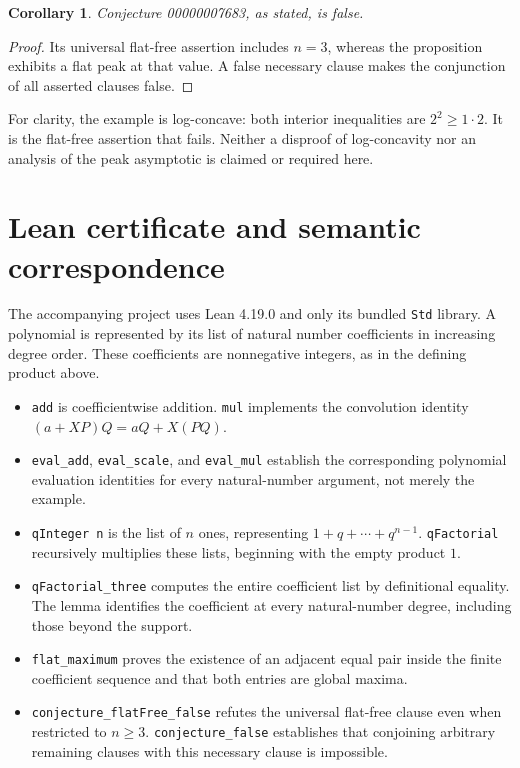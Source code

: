 \documentclass[11pt]{article}
\newtheorem{corollary}{Corollary}
\begin{document}
\begin{corollary}
Conjecture 00000007683, as stated, is false.
\end{corollary}
\begin{proof}
Its universal flat-free assertion includes $n=3$, whereas the proposition
exhibits a flat peak at that value. A false necessary clause makes the
conjunction of all asserted clauses false.
\end{proof}

For clarity, the example is log-concave: both interior inequalities are
$2^2\geq 1\cdot 2$. It is the flat-free assertion that fails. Neither a
disproof of log-concavity nor an analysis of the peak asymptotic is claimed
or required here.

\section{Lean certificate and semantic correspondence}
The accompanying project uses Lean 4.19.0 and only its bundled
\texttt{Std} library. A polynomial is represented by its list of natural
number coefficients in increasing degree order. These coefficients are
nonnegative integers, as in the defining product above.

\begin{itemize}
\item \texttt{add} is coefficientwise addition.
\texttt{mul} implements the convolution identity
$(a+XP)Q=aQ+X(PQ)$.
\item \texttt{eval\_add}, \texttt{eval\_scale}, and
\texttt{eval\_mul} establish the corresponding polynomial evaluation
identities for every natural-number argument, not merely the example.
\item \texttt{qInteger n} is the list of $n$ ones, representing
$1+q+\cdots+q^{n-1}$.
\texttt{qFactorial} recursively multiplies these lists, beginning with
the empty product $1$.
\item \texttt{qFactorial\_three} computes the entire coefficient list
by definitional equality. The lemma  identifies
the coefficient at every natural-number degree, including those beyond
the support.
\item \texttt{flat\_maximum} proves the existence of an adjacent
equal pair inside the finite coefficient sequence and that both entries
are global maxima.
\item \texttt{conjecture\_flatFree\_false} refutes the universal
flat-free clause even when restricted to $n\geq 3$.
\texttt{conjecture\_false} establishes that conjoining arbitrary remaining
clauses with this necessary clause is impossible.
\end{itemize}
\end{document}
